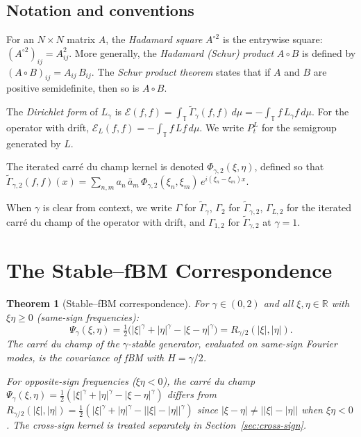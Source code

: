 \documentclass[11pt,a4paper]{article}
\theoremstyle{plain}
\newtheorem{theorem}{Theorem}[section]
\theoremstyle{definition}
\theoremstyle{remark}
\newcommand{\R}{\mathbb{R}}
\newcommand{\T}{\mathbb{T}}
\begin{document}
\subsection{Notation and conventions}\label{sec:notation}

For an $N \times N$ matrix $A$, the \emph{Hadamard square}
$A^{\circ 2}$ is the entrywise square: $(A^{\circ 2})_{ij} = A_{ij}^2$.
More generally, the \emph{Hadamard (Schur) product} $A \circ B$
is defined by $(A \circ B)_{ij} = A_{ij}\,B_{ij}$.
The \emph{Schur product theorem} states that if $A$ and $B$ are
positive semidefinite, then so is $A \circ B$.

The \emph{Dirichlet form} of $L_\gamma$ is
$\mathcal{E}(f,f) = \int_\T \widetilde{\Gamma}_\gamma(f,f)\,d\mu
= -\int_\T f\,L_\gamma f\,d\mu$.
For the operator with drift, $\mathcal{E}_L(f,f)
= -\int_\T f\,Lf\,d\mu$.
We write $P_t^L$ for the semigroup generated by $L$.

The iterated carr\'e du champ kernel is denoted
$\Phi_{\gamma,2}(\xi,\eta)$, defined so that
$\widetilde{\Gamma}_{\gamma,2}(f,f)(x)
= \sum_{n,m} a_n\,\bar{a}_m\,\Phi_{\gamma,2}(\xi_n,\xi_m)\,
e^{i(\xi_n-\xi_m)x}$.

When $\gamma$ is clear from context, we write
$\Gamma$ for $\widetilde{\Gamma}_\gamma$,
$\Gamma_2$ for $\widetilde{\Gamma}_{\gamma,2}$,
$\Gamma_{L,2}$ for the iterated carr\'e du champ of the
operator with drift, and
$\Gamma_{1,2}$ for $\widetilde{\Gamma}_{\gamma,2}$ at $\gamma = 1$.


\section{The Stable--fBM Correspondence}\label{sec:duality}

\begin{theorem}[Stable--fBM correspondence]\label{thm:duality}
For $\gamma \in (0,2)$ and all $\xi, \eta \in \R$ with
$\xi\eta \geq 0$ (same-sign frequencies):
\begin{equation}\label{eq:duality}
  \Psi_\gamma(\xi,\eta)
  = \tfrac{1}{2}\bigl(|\xi|^\gamma + |\eta|^\gamma
  - |\xi - \eta|^\gamma\bigr)
  = R_{\gamma/2}(|\xi|, |\eta|).
\end{equation}
The carr\'e du champ of the $\gamma$-stable generator, evaluated
on same-sign Fourier modes, is the covariance of fBM with $H = \gamma/2$.

For opposite-sign frequencies ($\xi\eta < 0$), the carr\'e du champ
$\Psi_\gamma(\xi,\eta) = \frac{1}{2}(|\xi|^\gamma + |\eta|^\gamma
- |\xi-\eta|^\gamma)$ differs from $R_{\gamma/2}(|\xi|,|\eta|)
= \frac{1}{2}(|\xi|^\gamma + |\eta|^\gamma - \bigl||\xi|-|\eta|\bigr|^\gamma)$
since $|\xi - \eta| \neq \bigl||\xi|-|\eta|\bigr|$ when $\xi\eta < 0$.
The cross-sign kernel is treated separately in
Section~\ref{sec:cross-sign}.
\end{theorem}
\end{document}
